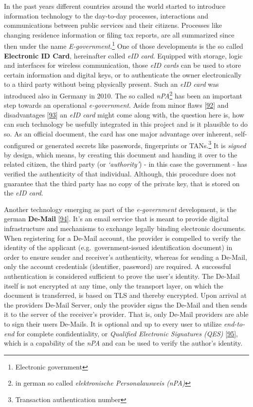 \documentclass[12pt,english,a4paper,titlepage,cleardoublepage=empty,dottedtoc]{report}
\begin{document}
In the past years different countries around the world started to
introduce information technology to the day-to-day processes,
interactions and communications between public services and their
citizens. Processes like changing residence information or filing tax
reports, are all summarized since then under the name
\emph{E-government}.\footnote{Electronic government} One of those
developments is the so called
\textbf{\protect\hypertarget{def--eid-card}{}{Electronic ID Card}},
hereinafter called \emph{eID card}. Equipped with storage, logic and
interfaces for wireless communication, those \emph{eID cards} can be
used to store certain information and digital keys, or to authenticate
the owner electronically to a third party without being physically
present. Such an \emph{eID card} was introduced also in Germany in 2010.
The so called \emph{nPA}\footnote{in german so called
  \emph{elektronische Personalausweis (nPA)}} has been an important step
towards an operational \emph{e-government}. Aside from minor flaws
{[}\protect\hyperlink{ref-web_2013_npa-sicherheitsdefizit}{92}{]} and
disadvantages
{[}\protect\hyperlink{ref-web_2014_test-qes-support-in-npa}{93}{]} an
\emph{eID card} might come along with, the question here is, how can
such technology be usefully integrated in this project and is it
plausible to do so. As an official document, the card has one major
advantage over inherent, self-configured or generated secrets like
passwords, fingerprints or TANs.\footnote{Transaction authentication
  number} It is \emph{signed} by design, which means, by creating this
document and handing it over to the related citizen, the third party (or
\emph{`authority'}) - in this case the government - has verified the
authenticity of that individual. Although, this procedure does not
guarantee that the third party has no copy of the private key, that is
stored on the \emph{eID card}.

Another technology emerging as part of the \emph{e-government}
development, is the german
\textbf{\protect\hypertarget{def--de-mail}{}{De-Mail}}
{[}\protect\hyperlink{ref-web_2017_about-de-mail}{94}{]}. It's an email
service that is meant to provide digital infrastructure and mechanisms
to exchange legally binding electronic documents. When registering for a
De-Mail account, the provider is compelled to verify the identity of the
applicant (e.g.~government-issued identification document) in order to
ensure sender and receiver's authenticity, whereas for sending a
De-Mail, only the account credentials (identifier, password) are
required. A successful authentication is considered sufficient to prove
the user's identity. The De-Mail itself is not encrypted at any time,
only the transport layer, on which the document is transferred, is based
on TLS and thereby encrypted. Upon arrival at the providers De-Mail
Server, only the provider signs the De-Mail and then sends it to the
server of the receiver's provider. That is, only De-Mail providers are
able to sign their users De-Mails. It is optional and up to every user
to utilize \emph{end-to-end} for complete confidentiality, or
\emph{Qualified Electronic Signatures (QES)}
{[}\protect\hyperlink{ref-web_2017_wikipedia_qes}{95}{]}, which is a
capability of the \emph{nPA} and can be used to verify the author's
identity.
\end{document}
